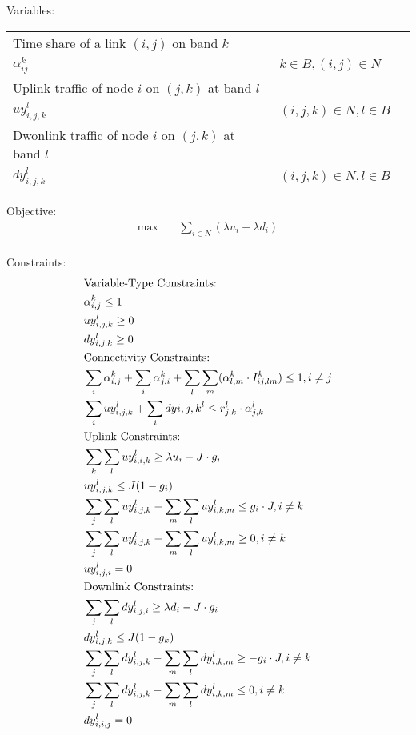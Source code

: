 \vspace{2pt}
Variables:
\vspace{1pt}

\begin{tabular}{lll}
Time share of a link $(i,j)$ on band $k$\\ 
$\alpha_{ij}^k$ & $k\in B, (i,j) \in N$ & \\
 Uplink traffic of node $i$ on $(j,k)$ at band $l$ \\ 
$uy_{i,j,k}^l$ & $(i,j,k) \in N, l \in B$ & \\
Dwonlink traffic of node $i$ on $(j,k)$ at band $l$ \\ 
$dy_{i,j,k}^l$ & $(i,j,k) \in N, l \in B$ & 
\end{tabular}
\vspace{1pt}

Objective:
\begin{align}
\max \quad
& \sum_{i \in N}(\lambda u_i+ \lambda d_i)
\end{align}\\

Constraints:
\begin{align}
& \text{Variable-Type Constraints:}\notag \\
& \alpha _{i,j}^k \leq 1 \\
& uy_{i,j,k}^l \geq 0 \\
& dy_{i,j,k}^l \geq 0 \\
& \text{Connectivity Constraints:} \notag \\
\label{opt:1}
& \sum_i \alpha_{i,j}^k + \sum_i \alpha_{j,i}^k + \sum_l\sum_m(\alpha_{l,m}^k \cdot I_{ij,lm}^k) \leq 1, i\neq j \\
\label{opt:2}
& \sum_i uy_{i,j,k}^l + \sum_i dy{i,j,k}^l \leq r_{j,k}^l \cdot \alpha_{j,k}^l \\
& \text{Uplink Constraints:}\notag \\
\label{opt:3}
& \sum_k \sum_l uy_{i,i,k}^l \geq \lambda u_i - J\cdot g_i \\
\label{opt:4}
& uy_{i,j,k}^l \leq J(1-g_i) \\
\label{opt:5}
& \sum_j\sum_l uy_{i,j,k}^l - \sum_m\sum_l uy_{i,k,m}^l \leq g_i \cdot J , i \neq k\\
\label{opt:6}
& \sum_j\sum_l uy_{i,j,k}^l - \sum_m \sum_l uy_{i,k,m}^l \geq 0, i \neq k\\
\label{opt:7}
& uy_{i,j,i}^l=0\\
& \text{Downlink Constraints:}\notag \\
\label{opt:8}
& \sum_j \sum_l dy_{i,j,i}^l \geq \lambda d_i - J\cdot g_i \\
\label{opt:9}
& dy_{i,j,k}^l \leq J(1-g_k) \\
\label{opt:10}
& \sum_j\sum_l dy_{i,j,k}^l - \sum_m\sum_l dy_{i,k,m}^l \geq -g_i \cdot J, i \neq k\\
\label{opt:11}
& \sum_j\sum_l dy_{i,j,k}^l - \sum_m \sum_l dy_{i,k,m}^l \leq 0, i \neq k\\
\label{opt:12}
& dy_{i,i,j}^l=0
\end{align}

